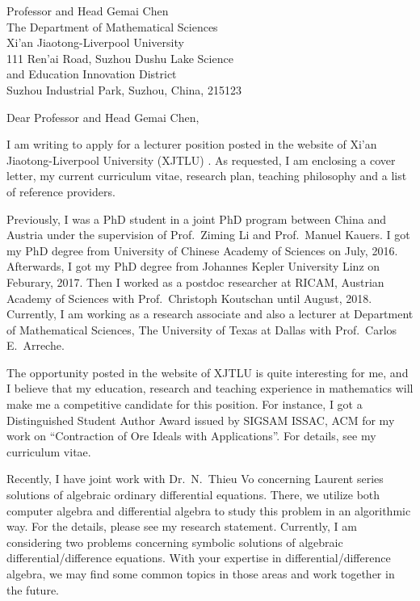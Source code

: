 \documentclass[11pt, a4paper]{letter} %
\begin{document}

\begin{letter}{
	Professor and Head Gemai Chen \\
	The Department of Mathematical Sciences\\
	Xi’an Jiaotong-Liverpool University\\
	111 Ren'ai Road, Suzhou Dushu Lake Science \\
	and Education Innovation District \\
	Suzhou Industrial Park, Suzhou, China, 215123
}


\opening{Dear Professor and Head Gemai Chen,}

I am writing to apply for a lecturer position posted in the website of Xi’an Jiaotong-Liverpool University (XJTLU) . 
As requested, I am enclosing a cover letter, my current curriculum vitae, research plan, teaching philosophy and a list of reference providers. 

Previously, I was a PhD student in a joint PhD program between China and Austria under the supervision of Prof.\ Ziming Li and Prof.\ Manuel Kauers. 
I got my PhD degree from University of Chinese Academy of Sciences on July, 2016. 
Afterwards, I got my PhD degree from Johannes Kepler University Linz on Feburary, 2017. 
Then I worked as a postdoc researcher at RICAM, Austrian Academy of Sciences with Prof.\ Christoph Koutschan until August, 2018. Currently, 
I am working as a research associate and also a lecturer at Department of Mathematical Sciences, The University of Texas at Dallas with Prof.\ Carlos E.\ Arreche.

The opportunity posted in the website of XJTLU is quite interesting for me, 
and I believe that my education, research and teaching experience in mathematics will make me a competitive candidate for this position.
For instance, I got a Distinguished Student Author Award issued by SIGSAM ISSAC, ACM for my work on ``Contraction of Ore Ideals with Applications''. 
For details, see my curriculum vitae.

Recently, I have joint work with Dr.\ N.\ Thieu Vo concerning Laurent series solutions of algebraic ordinary differential equations. 
There, we utilize both computer algebra and differential algebra to study this problem in an algorithmic way. 
For the details, please see my research statement. 
Currently, I am considering two problems concerning symbolic solutions of algebraic differential/difference equations. 
With your expertise in differential/difference algebra, we may find some common topics in those areas and work together in the future. 


\end{letter}
\end{document}
